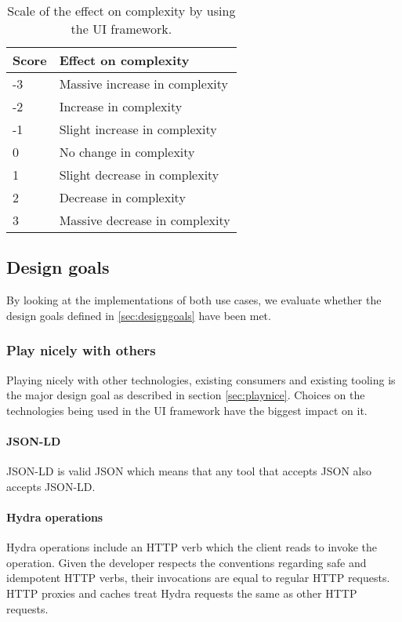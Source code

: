 \begin{table}[!htb]
  \begin{center}
    \begin{tabular}{|l|l|}
      \hline
      \textbf{Score} & \textbf{Effect on complexity} \\
      \hline
      -3 & Massive increase in complexity \\
      \hline
      -2 & Increase in complexity \\
      \hline
      -1 & Slight increase in complexity \\
      \hline
      0 & No change in complexity \\
      \hline
      1 & Slight decrease in complexity \\
      \hline
      2 & Decrease in complexity \\
      \hline
      3 & Massive decrease in complexity \\
      \hline
    \end{tabular}
    \caption{Scale of the effect on complexity by using the UI framework.}
    \label{tab:complexityscore}
  \end{center}
\end{table}

\subsection{Design goals}
By looking at the implementations of both use cases, we evaluate whether the design goals defined in \ref{sec:designgoals} have been met.

\subsubsection{Play nicely with others}
Playing nicely with other technologies, existing consumers and existing tooling is the major design goal as described in section \ref{sec:playnice}. Choices on the technologies being used in the UI framework have the biggest impact on it.

\paragraph{JSON-LD}
JSON-LD is valid JSON which means that any tool that accepts JSON also accepts JSON-LD.

\paragraph{Hydra operations}
Hydra operations include an  HTTP verb which the client reads to invoke the operation. Given the developer respects the conventions regarding safe and idempotent HTTP verbs, their invocations are equal to regular HTTP requests. HTTP proxies and caches treat Hydra requests the same as other HTTP requests.

